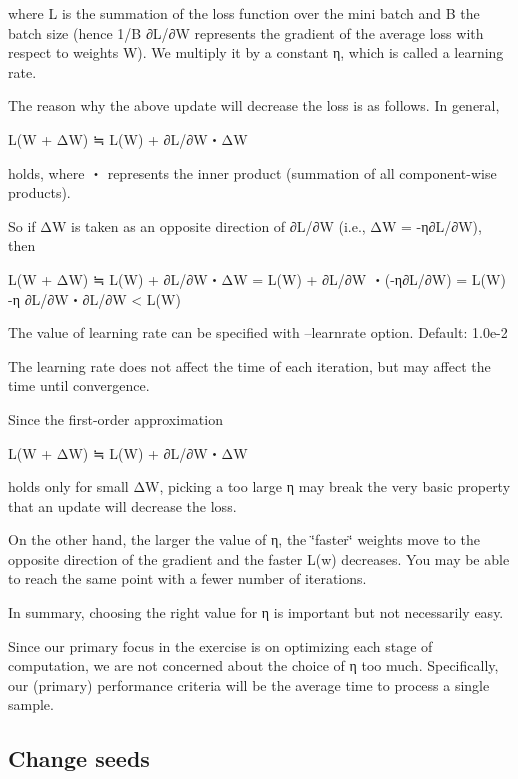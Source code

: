 where L is the summation of the loss function over the mini batch and B the batch size (hence 1/B ∂\+L/∂W represents the gradient of the average loss with respect to weights W). We multiply it by a constant η, which is called a learning rate.

The reason why the above update will decrease the loss is as follows. In general, \begin{DoxyVerb}L(W + ΔW) ≒ L(W) + ∂L/∂W・ΔW
\end{DoxyVerb}


holds, where ・ represents the inner product (summation of all component-\/wise products).

So if ΔW is taken as an opposite direction of ∂\+L/∂W (i.\+e., ΔW = -\/η∂\+L/∂W), then \begin{DoxyVerb}L(W + ΔW) ≒ L(W) + ∂L/∂W・ΔW
           = L(W) + ∂L/∂W ・(-η∂L/∂W)
           = L(W) -η ∂L/∂W・∂L/∂W
           < L(W)
\end{DoxyVerb}


The value of learning rate can be specified with --learnrate option. Default\+: 1.\+0e-\/2

The learning rate does not affect the time of each iteration, but may affect the time until convergence.

Since the first-\/order approximation \begin{DoxyVerb}L(W + ΔW) ≒ L(W) + ∂L/∂W・ΔW
\end{DoxyVerb}


holds only for small ΔW, picking a too large η may break the very basic property that an update will decrease the loss.

On the other hand, the larger the value of η, the \char`\"{}faster\char`\"{} weights move to the opposite direction of the gradient and the faster L(w) decreases. You may be able to reach the same point with a fewer number of iterations.

In summary, choosing the right value for η is important but not necessarily easy.

Since our primary focus in the exercise is on optimizing each stage of computation, we are not concerned about the choice of η too much. Specifically, our (primary) performance criteria will be the average time to process a single sample.

\subsection*{Change seeds }

